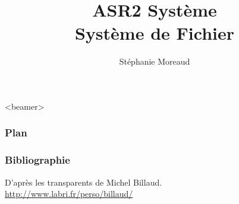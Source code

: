 \def\col{blue}

\usepackage{multicol}

\def\enseignement{ASR2 Système}
\title[]{\enseignement\\
Système de Fichier}
\author{Stéphanie Moreaud}
\date{}

   
\newcommand{\TITRE}[1]{
  \begin{frame} \begin{center}\huge{#1}\end{center}
\end{frame}
}
\newcommand{\FIGURE}[2]{
  \begin{frame} \frametitle{\insertsubsection} 
    \begin{figure} \texttt{[image: fichiers-images/\#1]} 
    \end{figure} 
    \begin{center}\large{#2}\end{center}
\end{frame} }


\begin{frame}
  \titlepage
\end{frame}

\begin{frame}<beamer>
  \frametitle{Plan} 
      \tableofcontents[sections={1-5},currentsection, hideothersubsections] 
\end{frame}

\begin{frame}
\frametitle{Bibliographie}

\small
\nocite{*}    
 
\vspace{0.5cm}    
D'après les transparents de Michel Billaud.\\
\url{http://www.labri.fr/perso/billaud/}
\end{frame}


